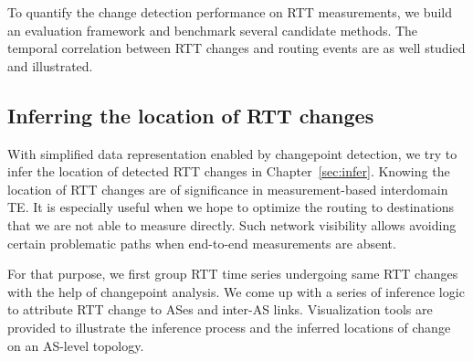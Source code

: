 To quantify the change detection performance on RTT measurements, we build an evaluation framework and benchmark several candidate methods.
The temporal correlation between RTT changes and routing events are as well studied and illustrated.

\subsection{Inferring the location of RTT changes}
With simplified data representation enabled by changepoint detection, we try to infer the location of detected RTT changes in Chapter~\ref{sec:infer}.
Knowing the location of RTT changes are of significance in measurement-based interdomain TE.
It is especially useful when we hope to optimize the routing to destinations that we are not able to measure directly.
Such network visibility allows avoiding certain problematic paths when end-to-end measurements are absent.

For that purpose, we first group RTT time series undergoing same RTT changes with the help of changepoint analysis.
We come up with a series of inference logic to attribute RTT change to ASes and inter-AS links.
Visualization tools are provided to illustrate the inference process and the inferred locations of change on an AS-level topology.
